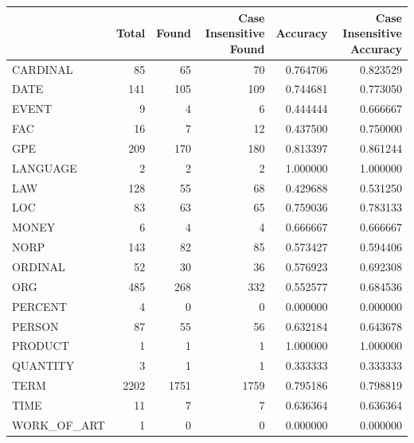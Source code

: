 \begin{tabular}{lrrrrr}
\toprule
 & Total & Found & Case Insensitive Found & Accuracy & Case Insensitive Accuracy \\
\midrule
CARDINAL & 85 & 65 & 70 & 0.764706 & 0.823529 \\
DATE & 141 & 105 & 109 & 0.744681 & 0.773050 \\
EVENT & 9 & 4 & 6 & 0.444444 & 0.666667 \\
FAC & 16 & 7 & 12 & 0.437500 & 0.750000 \\
GPE & 209 & 170 & 180 & 0.813397 & 0.861244 \\
LANGUAGE & 2 & 2 & 2 & 1.000000 & 1.000000 \\
LAW & 128 & 55 & 68 & 0.429688 & 0.531250 \\
LOC & 83 & 63 & 65 & 0.759036 & 0.783133 \\
MONEY & 6 & 4 & 4 & 0.666667 & 0.666667 \\
NORP & 143 & 82 & 85 & 0.573427 & 0.594406 \\
ORDINAL & 52 & 30 & 36 & 0.576923 & 0.692308 \\
ORG & 485 & 268 & 332 & 0.552577 & 0.684536 \\
PERCENT & 4 & 0 & 0 & 0.000000 & 0.000000 \\
PERSON & 87 & 55 & 56 & 0.632184 & 0.643678 \\
PRODUCT & 1 & 1 & 1 & 1.000000 & 1.000000 \\
QUANTITY & 3 & 1 & 1 & 0.333333 & 0.333333 \\
TERM & 2202 & 1751 & 1759 & 0.795186 & 0.798819 \\
TIME & 11 & 7 & 7 & 0.636364 & 0.636364 \\
WORK_OF_ART & 1 & 0 & 0 & 0.000000 & 0.000000 \\
\bottomrule
\end{tabular}
